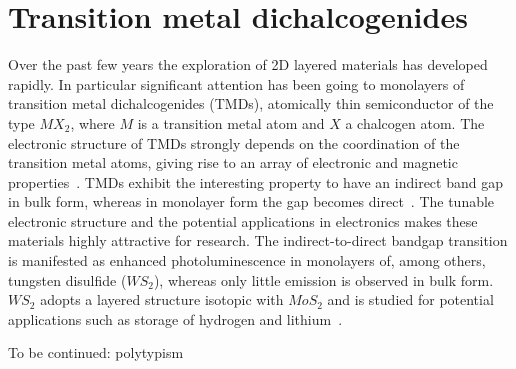 \section{Transition metal dichalcogenides}
\label{sec:tmd}

Over the past few years the exploration of 2D layered materials
has developed rapidly. 
%
In particular significant attention has been 
going to monolayers of transition metal dichalcogenides (TMDs),
atomically thin semiconductor of the type $MX_2$, where $M$ is a 
transition metal atom and $X$ a chalcogen atom. 
%
The electronic structure of TMDs strongly depends on the coordination 
of the transition metal atoms, giving rise to an array of electronic
and magnetic properties~\cite{Chhowalla:2013}.
%
TMDs exhibit the interesting property to have an indirect
band gap in bulk form, whereas in monolayer form the gap becomes
direct~\cite{Splendiani:2010}.
%
The tunable electronic structure and the potential applications in
electronics makes these materials highly attractive for research. 
%
The indirect-to-direct bandgap transition is manifested as enhanced
photoluminescence in monolayers of, among others, tungsten disulfide
($WS_2$), whereas only little emission is observed in bulk form.
%
$WS_2$ adopts a layered structure isotopic with $MoS_2$ and is studied
for potential applications such as storage of hydrogen and lithium~\cite{Bhandavat:2012}.
%

To be continued: polytypism

